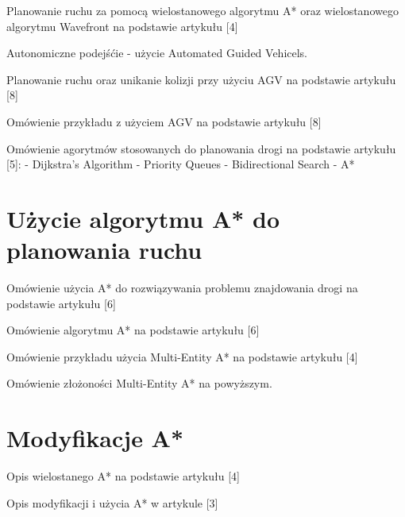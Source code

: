 Planowanie ruchu za pomocą wielostanowego algorytmu A* oraz wielostanowego algorytmu Wavefront na podstawie artykułu [4]

Autonomiczne podejśćie - użycie Automated Guided Vehicels.

Planowanie ruchu oraz unikanie kolizji przy użyciu AGV na podstawie artykułu [8]

Omówienie przykładu z użyciem AGV na podstawie artykułu [8]

Omówienie agorytmów stosowanych do planowania drogi na podstawie artykułu [5]:
- Dijkstra's Algorithm
- Priority Queues
- Bidirectional Search
- A*

\section{Użycie algorytmu A* do planowania ruchu}

Omówienie użycia A* do rozwiązywania problemu znajdowania drogi na podstawie artykułu [6]

Omówienie algorytmu A* na podstawie artykułu [6]

Omówienie przykładu użycia Multi-Entity A* na podstawie artykułu [4]

Omówienie złożoności Multi-Entity A* na powyższym.

\section{Modyfikacje A*}

Opis wielostanego A* na podstawie artykułu [4]

Opis modyfikacji i użycia A* w artykule [3]
